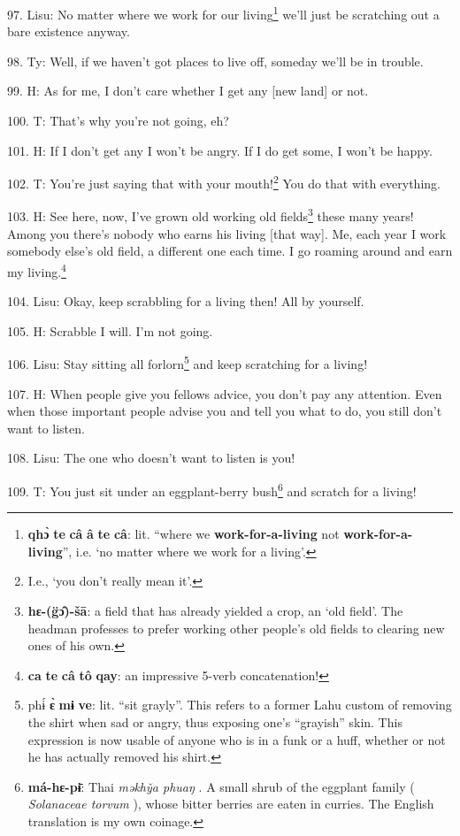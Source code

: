 97. Lisu: No matter where we work for our living\footnote{\textbf{qhɔ̀} \textbf{te} \textbf{câ} \textbf{â} \textbf{te} \textbf{câ}: lit. ``where we \textbf{work-for-a-living} not \textbf{work-for-a-living}'', i.e. `no matter where we work for a living'.} we'll just be scratching out
a bare existence anyway.

98. Ty: Well, if we haven't got places to live off, someday we'll be in trouble.

99. H: As for me, I don't care whether I get any [new land] or not.

100. T: That's why you're not going, eh?

101. H: If I don't get any I won't be angry. If I do get some, I won't be happy.

102. T: You're just saying that with your mouth!\footnote{I.e., `you don't really mean it'.} You do that with everything.

103. H: See here, now, I've grown old working old fields\footnote{\textbf{hɛ-(g̈ɔ̂)-šā}: a field that has already yielded a crop, an `old field'. The headman professes to prefer working other people's old fields to clearing new ones of his own.} these many years! Among
you there's nobody who earns his living [that way]. Me, each year I work somebody
else's old field, a different one each time. I go roaming around and earn my living.\footnote{\textbf{ca} \textbf{te} \textbf{câ} \textbf{tô} \textbf{qay}: an impressive 5-verb concatenation!}

104. Lisu: Okay, keep scrabbling for a living then! All by yourself.

105. H: Scrabble I will. I'm not going.

106. Lisu: Stay sitting all forlorn\footnote{phɨ́ \textbf{ɛ̀} \textbf{mɨ} \textbf{ve}: lit. ``sit grayly''. This refers to a former Lahu custom of removing the shirt when sad or angry, thus exposing one's ``grayish'' skin. This expression is now usable of anyone who is in a funk or a huff, whether or not he has actually removed his shirt.} and keep scratching for a living!

107. H: When people give you fellows advice, you don't pay any attention. Even when
those important people advise you and tell you what to do, you still don't want
to listen.

108. Lisu: The one who doesn't want to listen is you!

109. T: You just sit under an eggplant-berry bush\footnote{\textbf{má-hɛ-pɨ̄}: Thai \textit{məkhy̌a phuaŋ }. A small shrub of the eggplant family ( \textit{Solanaceae torvum }), whose bitter berries are eaten in curries. The English translation is my own coinage.} and scratch for a living!

